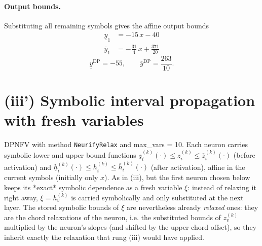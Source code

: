 \documentclass[11pt]{article}
\begin{document}
\paragraph{Output bounds.}
Substituting all remaining symbols gives the affine output bounds
\begin{align*}
\underline{y}_{1} &= -15\,x - 40
\end{align*}
\begin{align*}
\overline{y}_{1} &= -\frac{31}{4}\,x + \frac{371}{20}
\end{align*}
\begin{equation*}
\underline{y}^{\text{DP}} = -55, \qquad \overline{y}^{\text{DP}} = \frac{263}{10}.
\end{equation*}

\section{(iii') Symbolic interval propagation with fresh variables}
DPNFV with method \texttt{NeurifyRelax} and max\_vars = 10. Each neuron carries symbolic lower and upper bound functions
$\underline{z}^{(k)}_i(\cdot) \le z^{(k)}_i \le \overline{z}^{(k)}_i(\cdot)$ (before activation)
and $\underline{h}^{(k)}_i(\cdot) \le h^{(k)}_i \le \overline{h}^{(k)}_i(\cdot)$ (after activation),
affine in the current symbols (initially only $x$).
As in (iii), but the first neuron chosen below keeps its *exact*
symbolic dependence as a fresh variable $\xi$: instead of relaxing it right away, $\xi = h^{(k)}_v$
is carried symbolically and only substituted at the next layer. The stored symbolic bounds of $\xi$
are nevertheless already \emph{relaxed} ones: they are the chord relaxations of the neuron, i.e.
the substituted bounds of $z^{(k)}_v$ multiplied by the neuron's slopes (and shifted by the upper
chord offset), so they inherit exactly the relaxation that rung (iii) would have applied.
\end{document}
